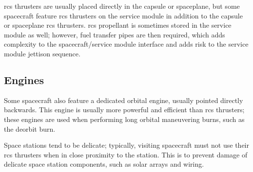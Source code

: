 \acrshort{rcs} thrusters are usually placed directly in the capsule or
spaceplane, but some spacecraft feature \acrshort{rcs} thrusters on
the service module in addition to the capsule or spaceplane
\acrshort{rcs} thrusters. \acrshort{rcs} propellant is sometimes
stored in the service module as well; however, fuel transfer pipes are
then required, which adds complexity to the spacecraft/service module
interface and adds risk to the service module jettison sequence.

\subsection{Engines}

Some spacecraft also feature a dedicated orbital engine, usually
pointed directly backwards. This engine is usually more powerful and
efficient than \acrshort{rcs} thrusters; these engines are used when
performing long orbital maneuvering burns, such as the deorbit burn.

Space stations tend to be delicate; typically, visiting spacecraft
must not use their \acrshort{rcs} thrusters when in close proximity to
the station. This is to prevent damage of delicate space station
components, such as solar arrays and wiring.

